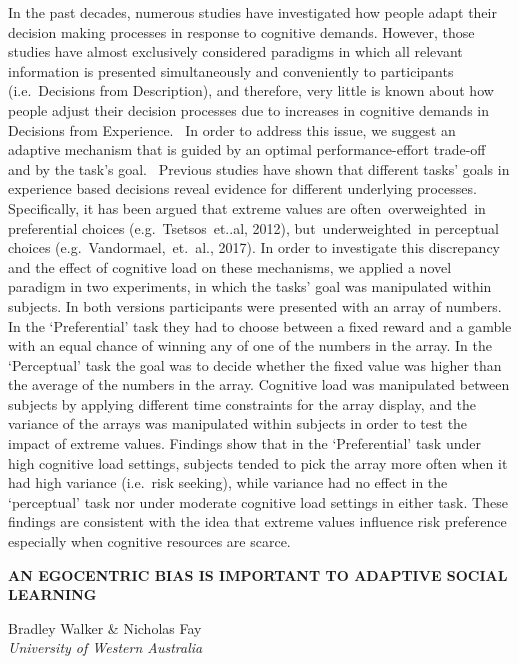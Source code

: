 \documentclass[]{article}
\begin{document}
In the past decades, numerous studies have investigated how people adapt
their decision making processes in response to cognitive demands.
However, those studies have almost exclusively considered paradigms in
which all relevant information is presented simultaneously and
conveniently to participants (i.e.~Decisions from Description), and
therefore, very little is known about how people adjust their decision
processes due to increases in cognitive demands in Decisions from
Experience.~ In order to address this issue, we suggest an adaptive
mechanism that is guided by an optimal performance-effort trade-off and
by the task's goal.~ Previous studies have shown that different tasks'
goals in experience based decisions reveal evidence for different
underlying processes. Specifically, it has been argued that extreme
values are often~overweighted~in preferential choices
(e.g.~Tsetsos~et..al, 2012), but~underweighted~in perceptual choices
(e.g.~Vandormael,~et.~al., 2017). In order to investigate this
discrepancy and the effect of cognitive load on these mechanisms, we
applied a novel paradigm in two experiments, in which the tasks' goal
was manipulated within subjects. In both versions participants were
presented with an array of numbers. In the `Preferential' task they had
to choose between a fixed reward and a gamble with an equal chance of
winning any of one of the numbers in the array. In the `Perceptual' task
the goal was to decide whether the fixed value was higher than the
average of the numbers in the array. Cognitive load was manipulated
between subjects by applying different time constraints for the array
display, and the variance of the arrays was manipulated within subjects
in order to test the impact of extreme values. Findings show that in the
`Preferential' task under high cognitive load settings, subjects tended
to pick the array more often when it had high variance (i.e.~risk
seeking), while variance had no effect in the `perceptual' task nor
under moderate cognitive load settings in either task. These findings
are consistent with the idea that extreme values influence risk
preference especially when cognitive resources are scarce.\\
\pagebreak  

\textbf{AN EGOCENTRIC BIAS IS IMPORTANT TO ADAPTIVE SOCIAL LEARNING}

Bradley Walker \& Nicholas Fay\\
\emph{University of Western Australia}
\end{document}
